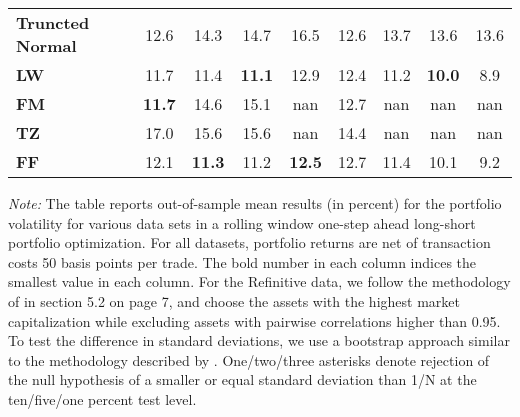 \begin{table}[p]
{\begin{tabularx}{\textwidth}{Xcccccccc}
\textbf{Truncted Normal} & \cellcolor{gray!13}12.6 & \cellcolor{gray!22}14.3 & \cellcolor{gray!22}14.7 & \cellcolor{gray!22}16.5 & \cellcolor{gray!27}12.6 & \cellcolor{gray!22}13.7 & \cellcolor{gray!18}13.6 & \cellcolor{gray!18}13.6 \\
\textbf{LW} & \cellcolor{gray!40}11.7 & \cellcolor{gray!40}11.4 & \cellcolor{gray!45}\textbf{11.1} & \cellcolor{gray!40}12.9 & \cellcolor{gray!31}12.4 & \cellcolor{gray!36}11.2 & \cellcolor{gray!45}\textbf{10.0} & \cellcolor{gray!40}8.9 \\
\textbf{FM} & \cellcolor{gray!45}\textbf{11.7} & \cellcolor{gray!18}14.6 & \cellcolor{gray!11}15.1 & \cellcolor{gray!0}nan & \cellcolor{gray!18}12.7 & \cellcolor{gray!0}nan & \cellcolor{gray!0}nan & \cellcolor{gray!0}nan \\
\textbf{TZ} & \cellcolor{gray!0}17.0 & \cellcolor{gray!0}15.6 & \cellcolor{gray!4}15.6 & \cellcolor{gray!0}nan & \cellcolor{gray!4}14.4 & \cellcolor{gray!0}nan & \cellcolor{gray!0}nan & \cellcolor{gray!0}nan \\
\textbf{FF} & \cellcolor{gray!22}12.1 & \cellcolor{gray!45}\textbf{11.3} & \cellcolor{gray!40}11.2 & \cellcolor{gray!45}\textbf{12.5} & \cellcolor{gray!22}12.7 & \cellcolor{gray!27}11.4 & \cellcolor{gray!40}10.1 & \cellcolor{gray!36}9.2 \\
\bottomrule
\end{tabularx}
\vspace{0.3em}
{\footnotesize \textit{Note:} The table reports out-of-sample mean results (in percent) for the portfolio volatility for various data sets in a rolling window one-step ahead long-short portfolio optimization. For all datasets, portfolio returns are net of transaction costs 50 basis points per trade. The bold number in each column indices the smallest value in each column. For the Refinitive data, we follow the methodology of \citet{denard2022} in section 5.2 on page 7, and choose the assets with the highest market capitalization while excluding assets with pairwise correlations higher than 0.95. To test the difference in standard deviations, we use a bootstrap approach similar to the methodology described by \citet{ledoit2008}. One/two/three asterisks denote rejection of the null hypothesis of a smaller or equal standard deviation than 1/N at the ten/five/one percent test level.}}
\end{table}
